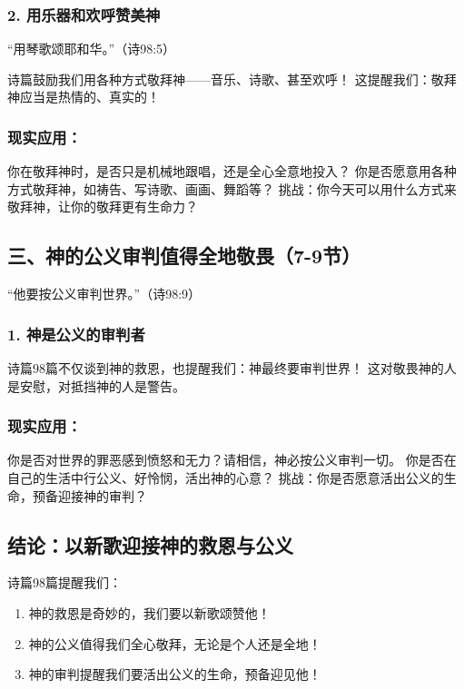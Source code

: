 \documentclass[a4paper, 12pt]{article}
\begin{document}
\subsubsection*{2. 用乐器和欢呼赞美神}
“用琴歌颂耶和华。”（诗98:5）

诗篇鼓励我们用各种方式敬拜神——音乐、诗歌、甚至欢呼！
这提醒我们：敬拜神应当是热情的、真实的！
\subsubsection*{现实应用：}

你在敬拜神时，是否只是机械地跟唱，还是全心全意地投入？
你是否愿意用各种方式敬拜神，如祷告、写诗歌、画画、舞蹈等？
挑战：你今天可以用什么方式来敬拜神，让你的敬拜更有生命力？

\subsection*{三、神的公义审判值得全地敬畏（7-9节）}
“他要按公义审判世界。”（诗98:9）

\subsubsection*{1. 神是公义的审判者}
诗篇98篇不仅谈到神的救恩，也提醒我们：神最终要审判世界！
这对敬畏神的人是安慰，对抵挡神的人是警告。
\subsubsection*{现实应用：}

你是否对世界的罪恶感到愤怒和无力？请相信，神必按公义审判一切。
你是否在自己的生活中行公义、好怜悯，活出神的心意？
挑战：你是否愿意活出公义的生命，预备迎接神的审判？

\subsection*{结论：以新歌迎接神的救恩与公义}
诗篇98篇提醒我们：
\begin{enumerate}
    \item 神的救恩是奇妙的，我们要以新歌颂赞他！

    \item 神的公义值得我们全心敬拜，无论是个人还是全地！

    \item 神的审判提醒我们要活出公义的生命，预备迎见他！

\end{enumerate}
\end{document}
